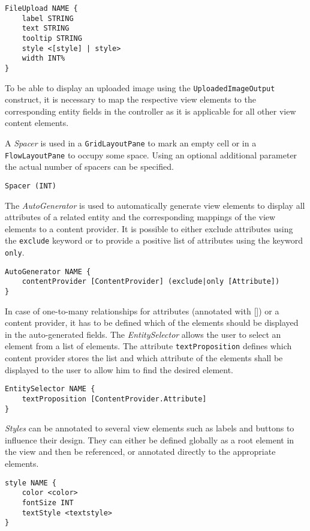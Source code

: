 \begin{lstlisting}
FileUpload NAME {
	label STRING
	text STRING
	tooltip STRING		
	style <[style] | style>
	width INT%
}	
\end{lstlisting}

To be able to display an uploaded image using the \lstinline!UploadedImageOutput! construct, it is necessary to map the respective view elements to the corresponding entity fields in the controller as it is applicable for all other view content elements. 

A \textit{Spacer} is used in a \lstinline!GridLayoutPane! to mark an empty cell or in a \lstinline!FlowLayoutPane! to occupy some space. Using an optional additional parameter the actual number of spacers can be specified.
\begin{lstlisting}
Spacer (INT)
\end{lstlisting}

The \textit{AutoGenerator} is used to automatically generate view elements to display all attributes of a related entity and the corresponding mappings of the view elements to a content provider. It is possible to either exclude attributes using the \lstinline!exclude! keyword or to provide a positive list of attributes using the keyword \lstinline!only!.
\begin{lstlisting}
AutoGenerator NAME {
	contentProvider [ContentProvider] (exclude|only [Attribute])
}
\end{lstlisting}

In case of one-to-many relationships for attributes (annotated with []) or a content provider, it has to be defined which of the elements should be displayed in the auto-generated fields. The \textit{EntitySelector} allows the user to select an element from a list of elements. The attribute \lstinline!textProposition! defines which content provider stores the list and which attribute of the elements shall be displayed to the user to allow him to find the desired element.
\begin{lstlisting}
EntitySelector NAME {
	textProposition [ContentProvider.Attribute]
}
\end{lstlisting}

\textit{Styles} can be annotated to several view elements such as labels and buttons to influence their design. They can either be defined globally as a root element in the view and then be referenced, or annotated directly to the appropriate elements.
\begin{lstlisting}
style NAME {
	color <color>
	fontSize INT
	textStyle <textstyle>
}
\end{lstlisting}

